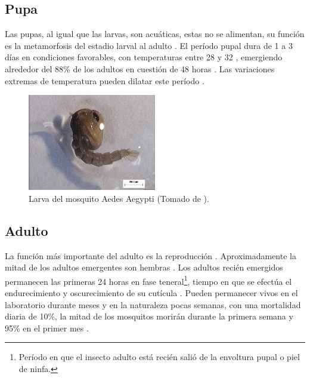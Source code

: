 \subsection{Pupa}
\label{subsec:ciclo-biologico-pupa}
Las pupas, al igual que las larvas, son acuáticas, estas no se alimentan, su función es la
metamorfosis del estadio larval al adulto \cite{ThironIzcazaJ2003}. El período pupal dura de 1
a 3 días en condiciones favorables, con temperaturas entre 28 y 32 \textcelsius
\cite{web-site:gMonteroBiologia}, emergiendo alrededor del 88\% de los adultos en cuestión de 48
horas \cite{ThironIzcazaJ2003}. Las variaciones extremas de temperatura pueden dilatar este período
\cite{web-site:gMonteroBiologia}.

\begin{figure}[!htbp]
\centering
\includegraphics[width=0.5\textwidth]{capitulo-3/graphics/pupa.png}
\caption{\label{fig:cap3-larvas} Larva del mosquito Aedes Aegypti (Tomado de
\cite{sivanathan2006ecology}).}
\end{figure}

\subsection{Adulto}
\label{subsec:ciclo-biologico-adulto}
La función más importante del adulto es la reproducción \cite{ThironIzcazaJ2003}. Aproximadamente
la mitad de los adultos emergentes son hembras \cite{otero2006stochastic, manrique1998desarrollo}.
Los adultos recién emergidos permanecen las primeras 24 horas en fase teneral\footnote{Período en
que el insecto adulto está recién salió de la envoltura pupal o piel de ninfa.}, tiempo en que se
efectúa el endurecimiento y oscurecimiento de su cutícula \cite{luevano1993ciclo}. Pueden
permanecer vivos en el laboratorio durante meses y en la naturaleza pocas semanas, con una
mortalidad diaria de 10\%, la mitad de los mosquitos morirán durante la primera semana y 95\% en
el primer mes \cite{ThironIzcazaJ2003}.

